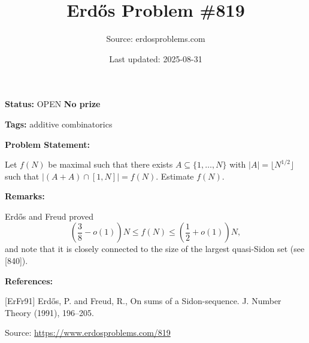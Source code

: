 \documentclass{article}
\title{Erd\H{o}s Problem \#819}
\date{Last updated: 2025-08-31}
\author{Source: erdosproblems.com}
\begin{document}
\maketitle

\noindent\textbf{Status:} OPEN \quad \textbf{No prize}

\noindent\textbf{Tags:} additive combinatorics

\medskip
\noindent\textbf{Problem Statement:}

Let $f(N)$ be maximal such that there exists $A\subseteq \{1,\ldots,N\}$ with $\lvert A\rvert=\lfloor N^{1/2}\rfloor$ such that $\lvert (A+A)\cap [1,N]\rvert=f(N)$. Estimate $f(N)$.

\bigskip
\noindent\textbf{Remarks:}

Erd\H{o}s and Freud \cite{ErFr91} proved\[\left(\frac{3}{8}-o(1)\right)N \leq f(N) \leq \left(\frac{1}{2}+o(1)\right)N,\]and note that it is closely connected to the size of the largest quasi-Sidon set (see [840]).

\bigskip
\noindent\textbf{References:}

[ErFr91] Erd\H{o}s, P. and Freud, R., On sums of a Sidon-sequence. J. Number Theory (1991), 196--205.

\bigskip
\noindent\small{Source: \url{https://www.erdosproblems.com/819}}
\end{document}
